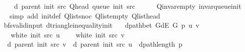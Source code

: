 \begin{isabellebody}
\ \ \ \ \ d\ {\isacharparenleft}{\kern0pt}parent\ {\isacharparenleft}{\kern0pt}init\ src{\isacharparenright}{\kern0pt}{\isacharparenright}{\kern0pt}\ {\isacharparenleft}{\kern0pt}Q{\isacharunderscore}{\kern0pt}head\ {\isacharparenleft}{\kern0pt}queue\ {\isacharparenleft}{\kern0pt}init\ src{\isacharparenright}{\kern0pt}{\isacharparenright}{\kern0pt}{\isacharparenright}{\kern0pt}\ {\isacharplus}{\kern0pt}\ {}{\isachardoublequoteclose}\isanewline
%
\isadelimproof
\ \ %
\endisadelimproof
%
\isatagproof
{}\isamarkupfalse%
\ Q{\isachardot}{\kern0pt}invar{\isacharunderscore}{\kern0pt}empty\ invar{\isacharunderscore}{\kern0pt}queue{\isacharunderscore}{\kern0pt}init\isanewline
\ \ \isamarkupfalse%
\ {\isacharparenleft}{\kern0pt}simp\ add{\isacharcolon}{\kern0pt}\ init{\isacharunderscore}{\kern0pt}def\ Q{\isachardot}{\kern0pt}list{\isacharunderscore}{\kern0pt}snoc\ Q{\isachardot}{\kern0pt}list{\isacharunderscore}{\kern0pt}empty\ Q{\isachardot}{\kern0pt}list{\isacharunderscore}{\kern0pt}head{\isacharparenright}{\kern0pt}%
\endisatagproof
{\isafoldproof}%
%
\isadelimproof
\isanewline
%
\endisadelimproof
\isanewline
{}\isamarkupfalse%
\ {\isacharparenleft}{\kern0pt}\ bfs{\isacharunderscore}{\kern0pt}valid{\isacharunderscore}{\kern0pt}input{\isacharparenright}{\kern0pt}\ d{\isacharunderscore}{\kern0pt}triangle{\isacharunderscore}{\kern0pt}inequality{\isacharunderscore}{\kern0pt}init{\isacharcolon}{\kern0pt}\isanewline
\ \ \ {\isachardoublequoteopen}dpath{\isacharunderscore}{\kern0pt}bet\ {\isacharparenleft}{\kern0pt}G{\isachardot}{\kern0pt}dE\ G{\isacharparenright}{\kern0pt}\ p\ u\ v{\isachardoublequoteclose}\isanewline
\ \ \ {\isachardoublequoteopen}{\isasymnot}\ white\ {\isacharparenleft}{\kern0pt}init\ src{\isacharparenright}{\kern0pt}\ u{\isachardoublequoteclose}\isanewline
\ \ \ {\isachardoublequoteopen}{\isasymnot}\ white\ {\isacharparenleft}{\kern0pt}init\ src{\isacharparenright}{\kern0pt}\ v{\isachardoublequoteclose}\isanewline
\ \ \ {\isachardoublequoteopen}d\ {\isacharparenleft}{\kern0pt}parent\ {\isacharparenleft}{\kern0pt}init\ src{\isacharparenright}{\kern0pt}{\isacharparenright}{\kern0pt}\ v\ {\isasymle}\ d\ {\isacharparenleft}{\kern0pt}parent\ {\isacharparenleft}{\kern0pt}init\ src{\isacharparenright}{\kern0pt}{\isacharparenright}{\kern0pt}\ u\ {\isacharplus}{\kern0pt}\ dpath{\isacharunderscore}{\kern0pt}length\ p{\isachardoublequoteclose}\isanewline
%
\isadelimproof
\ \ %
\endisadelimproof
%
\isatagproof

\end{isabellebody}
